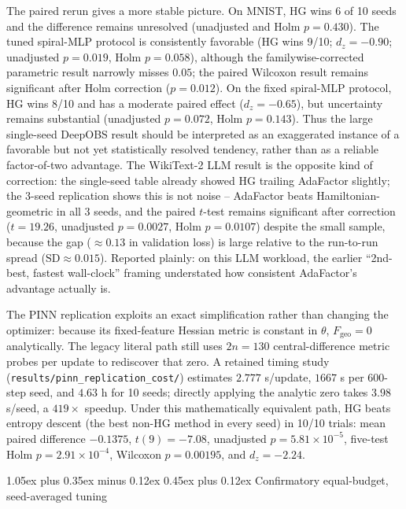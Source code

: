 \documentclass[10pt,twocolumn]{article}
\makeatletter
\renewcommand\subsection{\@startsection{subsection}{2}{0pt}%
  {1.05ex plus 0.35ex minus 0.12ex}%
  {0.45ex plus 0.12ex}%
  {\normalsize\bfseries}}
\makeatother
\begin{document}
The paired rerun gives a more stable picture. On MNIST, HG wins 6 of 10 seeds
and the difference remains unresolved (unadjusted and Holm $p=0.430$).
The tuned spiral-MLP protocol is consistently favorable (HG wins 9/10; $d_z=-0.90$;
unadjusted $p=0.019$, Holm $p=0.058$), although the familywise-corrected
parametric result narrowly misses $0.05$; the paired Wilcoxon result remains
significant after Holm correction ($p=0.012$). On the fixed spiral-MLP protocol, HG wins
8/10 and has a moderate paired effect ($d_z=-0.65$), but uncertainty remains
substantial (unadjusted $p=0.072$, Holm $p=0.143$). Thus the large
single-seed DeepOBS result should be interpreted as an exaggerated instance
of a favorable but not yet statistically resolved tendency, rather than as
a reliable factor-of-two advantage. The WikiText-2
LLM result is the opposite kind of correction: the single-seed table already
showed HG trailing AdaFactor slightly; the 3-seed replication shows this is
not noise -- AdaFactor beats Hamiltonian-geometric in all 3 seeds, and the
paired $t$-test remains significant after correction ($t=19.26$,
unadjusted $p=0.0027$, Holm $p=0.0107$) despite the small
sample, because the gap ($\approx0.13$ in validation loss) is large relative
to the run-to-run spread ($\mathrm{SD}\approx0.015$). Reported plainly: on
this LLM workload, the earlier ``2nd-best, fastest wall-clock'' framing
understated how consistent AdaFactor's advantage actually is.

The PINN replication exploits an exact simplification rather than changing
the optimizer: because its fixed-feature Hessian metric is constant in
$\theta$, $F_{\mathrm{geo}}=0$ analytically. The legacy literal path still
uses $2n=130$ central-difference metric probes per update to rediscover that
zero. A retained timing study
(\texttt{results/pinn\_replication\_cost/}) estimates $2.777$ s/update,
$1667$ s per 600-step seed, and $4.63$ h for 10 seeds; directly applying the
analytic zero takes $3.98$ s/seed, a $419\times$ speedup. Under this
mathematically equivalent path, HG beats entropy descent (the best non-HG
method in every seed) in 10/10 trials: mean paired difference $-0.1375$,
$t(9)=-7.08$, unadjusted $p=5.81\times10^{-5}$, five-test Holm
$p=2.91\times10^{-4}$, Wilcoxon $p=0.00195$, and $d_z=-2.24$.

\subsection{Confirmatory equal-budget, seed-averaged tuning}
\label{sec:equal-budget-tuning}
\end{document}
